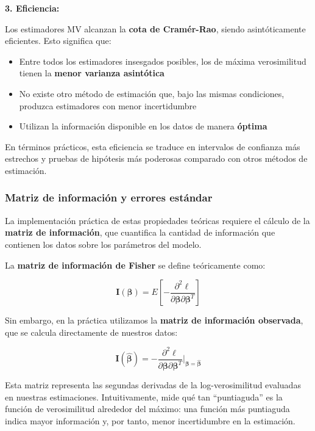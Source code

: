 \documentclass[
  letterpaper,
  DIV=11,
  numbers=noendperiod]{scrreprt}
\providecommand{\tightlist}{%
  \setlength{\itemsep}{0pt}\setlength{\parskip}{0pt}}
\begin{document}
\textbf{3. Eficiencia:}

Los estimadores MV alcanzan la \textbf{cota de Cramér-Rao}, siendo
asintóticamente eficientes. Esto significa que:

\begin{itemize}
\tightlist
\item
  Entre todos los estimadores insesgados posibles, los de máxima
  verosimilitud tienen la \textbf{menor varianza asintótica}
\item
  No existe otro método de estimación que, bajo las mismas condiciones,
  produzca estimadores con menor incertidumbre
\item
  Utilizan la información disponible en los datos de manera
  \textbf{óptima}
\end{itemize}

En términos prácticos, esta eficiencia se traduce en intervalos de
confianza más estrechos y pruebas de hipótesis más poderosas comparado
con otros métodos de estimación.

\subsubsection{Matriz de información y errores
estándar}\label{matriz-de-informaciuxf3n-y-errores-estuxe1ndar}

La implementación práctica de estas propiedades teóricas requiere el
cálculo de la \textbf{matriz de información}, que cuantifica la cantidad
de información que contienen los datos sobre los parámetros del modelo.

La \textbf{matriz de información de Fisher} se define teóricamente como:

\[\mathbf{I}(\boldsymbol{\beta}) = E\left[-\frac{\partial^2 \ell}{\partial \boldsymbol{\beta} \partial \boldsymbol{\beta}^T}\right]\]

Sin embargo, en la práctica utilizamos la \textbf{matriz de información
observada}, que se calcula directamente de nuestros datos:

\[\mathbf{I}(\hat{\boldsymbol{\beta}}) = -\frac{\partial^2 \ell}{\partial \boldsymbol{\beta} \partial \boldsymbol{\beta}^T}\bigg|_{\boldsymbol{\beta}=\hat{\boldsymbol{\beta}}}\]

Esta matriz representa las segundas derivadas de la log-verosimilitud
evaluadas en nuestras estimaciones. Intuitivamente, mide qué tan
``puntiaguda'' es la función de verosimilitud alrededor del máximo: una
función más puntiaguda indica mayor información y, por tanto, menor
incertidumbre en la estimación.
\end{document}
